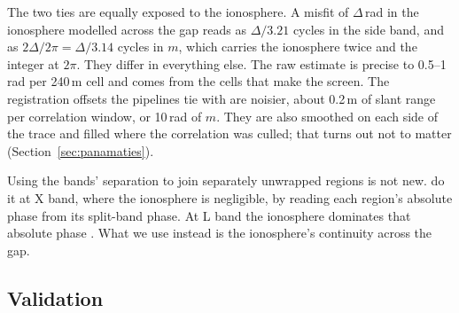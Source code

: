 The two ties are equally exposed to the ionosphere. A misfit of $\Delta$\,rad in the ionosphere modelled across the
gap reads as $\Delta/3.21$ cycles in the side band, and as $2\Delta/2\pi = \Delta/3.14$ cycles in $m$, which carries
the ionosphere twice and the integer at $2\pi$. They differ in everything else. The raw estimate is precise to
0.5--1\,rad per 240\,m cell and comes from the cells that make the screen. The registration offsets the pipelines tie
with are noisier, about 0.2\,m of slant range per correlation window, or 10\,rad of $m$. They are also smoothed on each
side of the trace and filled where the correlation was culled; that turns out not to matter
(Section~\ref{sec:panamaties}).

Using the bands' separation to join separately unwrapped regions is not new. \citet{libert2017split} do it at X band,
where the ionosphere is negligible, by reading each region's absolute phase from its split-band phase. At L band the
ionosphere dominates that absolute phase \citep{gomba2016toward}. What we use instead is the ionosphere's continuity
across the gap.

\subsection{Validation}
